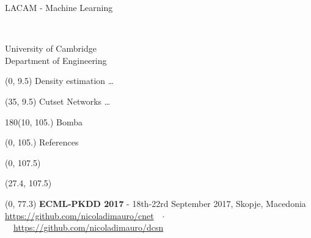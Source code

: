 \documentclass[draft]{beamer}
\begin{document}
\begin{frame}{}
\begin{textblock}{30}
\begin{minipage}[t]{15cm}
    LACAM - Machine Learning
    \end{minipage}\\[0.75cm]
    \scriptsize
    \begin{minipage}[t]{5cm}
      \vspace{-5pt}
    \end{minipage}\hspace{-5pt}
    \begin{minipage}[t]{15cm}
      \vspace{20pt}
      \flushleft
      University of Cambridge\\
      \vspace{2pt}
      Department of Engineering
    \end{minipage}
  \end{textblock}
  
  
  \begin{textblock}{30}(0, 9.5)
    Density estimation \dots
  \end{textblock}

  \begin{textblock}{30}(35, 9.5)
    Cutset Networks \dots
  \end{textblock}

  
    \begin{textblock}{180}(10, 105.)
    Bomba
  \end{textblock}
  
  \begin{textblock}{80}(0, 105.)
    References
  \end{textblock}

  
 \begin{textblock}{52}(0, 107.5)
    \small
    \setlength\bibitemsep{8pt}
    \printbibliography[heading=none]
  \end{textblock}
  
  \begin{textblock}{25.2}(27.4, 107.5)
    \small
  \end{textblock}
  

  \begin{textblock}{80}(0, 77.3)
    \small
    \textbf{ECML-PKDD 2017}  -  18th-22rd September 2017, Skopje, Macedonia\hfill
    {\url{https://github.com/nicoladimauro/cnet}}\ \ $\cdotp$ \ \
    {\url{https://github.com/nicoladimauro/dcsn}}
  \end{textblock}
  
\end{frame}
\end{document}
